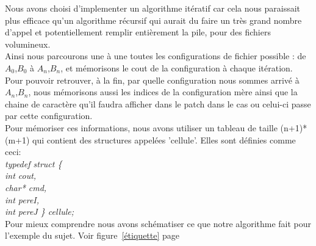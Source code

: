 \documentclass[a4paper, 10pt, french]{article}
\begin{document}
{Nous avons choisi d'implementer un algorithme itératif car cela nous paraissait plus efficace qu'un algorithme récursif qui aurait du faire un très grand nombre d'appel et potentiellement remplir entièrement la pile, pour des fichiers volumineux.
\\ \indent Ainsi nous parcourons une à une toutes les configurations de fichier possible : de $A_0$,$B_0$ à $A_n$,$B_n$, et mémorisons le cout de la configuration à chaque itération.
\\ \indent Pour pouvoir retrouver, à la fin, par quelle configuration nous sommes arrivé à $A_n$,$B_n$, nous mémorisons aussi les indices de la configuration mère ainsi que la chaine de caractère qu'il faudra afficher dans le patch dans le cas ou celui-ci passe par cette configuration.
\\ \indent Pour mémoriser ces informations, nous avons utiliser un tableau de taille (n+1)*(m+1) qui contient des structures appelées 'cellule'. Elles sont définies comme ceci:
{\em \\typedef struct  \{
\\ \indent int cout,
\\ \indent char* cmd,
\\ \indent int pereI,
\\ \indent int pereJ \} cellule;}
\\ \indent Pour mieux comprendre nous avons schématiser ce que notre algorithme fait pour l'exemple du sujet. Voir figure~\ref{étiquette} page~\pageref{étiquette} 

}
\end{document}
